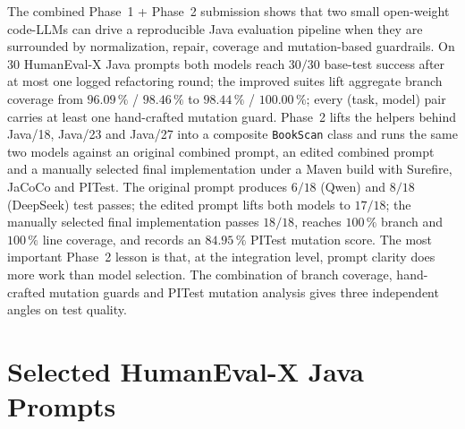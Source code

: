 \documentclass[journal]{IEEEtran}
\begin{document}
The combined Phase~1 + Phase~2 submission shows that two small open-weight
code-LLMs can drive a reproducible Java evaluation pipeline when they are
surrounded by normalization, repair, coverage and mutation-based
guardrails. On 30 HumanEval-X Java prompts both models reach $30/30$
base-test success after at most one logged refactoring round; the
improved suites lift aggregate branch coverage from $96.09\,\%$ /
$98.46\,\%$ to $98.44\,\%$ / $100.00\,\%$; every (task, model) pair
carries at least one hand-crafted mutation guard. Phase~2 lifts the
helpers behind Java/18, Java/23 and Java/27 into a composite
\texttt{BookScan} class and runs the same two models against an original
combined prompt, an edited combined prompt and a manually selected final
implementation under a Maven build with Surefire, JaCoCo and PITest.
The original prompt produces $6/18$ (Qwen) and $8/18$ (DeepSeek) test
passes; the edited prompt lifts both models to $17/18$; the manually
selected final implementation passes $18/18$, reaches $100\,\%$ branch
and $100\,\%$ line coverage, and records an $84.95\,\%$ PITest mutation
score. The most important Phase~2 lesson is that, at the integration
level, prompt clarity does more work than model selection. The
combination of branch coverage, hand-crafted mutation guards and
PITest mutation analysis gives three independent angles on test quality.

\appendices
\section{Selected HumanEval-X Java Prompts}\label{app:prompts}
\end{document}
